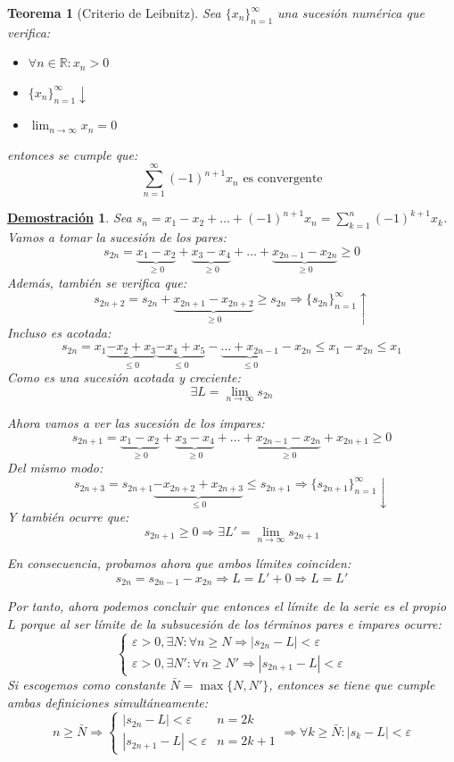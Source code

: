 \documentclass[10pt,a4paper,openright]{book}
\theoremstyle{break}
\newtheorem{theo}{Teorema}[chapter]
\newtheorem*{demo}{\underline{Demostración}}
\begin{document}
\begin{theo}[Criterio de Leibnitz]
Sea $\{x_n\}_{n=1}^\infty$ una sucesión numérica que verifica:
\begin{itemize}
\item $\forall n \in \mathbb{R}: x_n > 0$
\item $\{x_n\}_{n=1}^\infty \downarrow$
\item $\lim_{n \rightarrow \infty} x_n = 0$
\end{itemize}
entonces se cumple que:
$$\sum_{n=1}^{\infty} (-1)^{n+1}x_n\mbox{ es convergente}$$
\end{theo}
\begin{demo}
Sea $s_n = x_1 - x_2 + \ldots + (-1)^{n+1}x_n = \sum_{k=1}^{n} (-1)^{k+1} x_k$. Vamos a tomar la sucesión de los pares:
$$s_{2n} = \underbrace{x_1 - x_2}_{\geq 0} + \underbrace{x_3 - x_4}_{\geq 0} + \ldots + \underbrace{x_{2n-1} - x_{2n}}_{\geq 0} \geq 0$$
Además, también se verifica que:
$$s_{2n + 2} = s_{2n} + \underbrace{x_{2n + 1} - x_{2n + 2}}_{\geq 0} \geq s_{2n} \Rightarrow \{s_{2n}\}_{n=1}^\infty\uparrow$$
Incluso es acotada:
$$s_{2n} = x_1 \underbrace{-x_2 + x_3}_{\leq 0 } \underbrace{- x_4 + x_5 }_{\leq 0}- \underbrace{\ldots + x_{2n-1}}_{\leq 0} - x_{2n}\leq x_1 - x_{2n} \leq x_1 $$
Como es una sucesión acotada y creciente:
$$\exists L = \lim_{n \to \infty} s_{2n}$$

Ahora vamos a ver las sucesión de los impares:
$$s_{2n+1} =\underbrace{x_1 - x_2}_{\geq 0} + \underbrace{x_3 - x_4}_{\geq 0} + \ldots +\underbrace{x_{2n-1} - x_{2n}}_{\geq 0} + x_{2n+1} \geq 0$$
Del mismo modo:
$$s_{2n+3} = s_{2n+1} \underbrace{-x_{2n + 2} + x_{2n + 3}}_{\leq 0} \leq s_{2n+1} \Rightarrow  \{s_{2n+1}\}_{n=1}^\infty \downarrow$$
Y también ocurre que: 
$$s_{2n+1} \geq 0 \Rightarrow \exists L' = \lim_{n \to \infty} s_{2n+1}$$

En consecuencia, probamos ahora que ambos límites coinciden:
$$s_{2n} = s_{2n-1} - x_{2n} \Rightarrow L = L' + 0 \Rightarrow L = L'$$

Por tanto, ahora podemos concluir que entonces el límite de la serie es el propio $L$ porque al ser límite de la subsucesión de los términos pares e impares ocurre:
$$\begin{cases} \varepsilon > 0, \exists N : \forall n \geq N \Rightarrow |s_{2n} - L|<\varepsilon \\ \varepsilon > 0, \exists N' : \forall n \geq N' \Rightarrow |s_{2n+1} - L|<\varepsilon\end{cases} $$
Si escogemos como constante $\bar{N} = \max\{N, N'\}$, entonces se tiene que cumple ambas definiciones simultáneamente:
$$n \geq \bar{N} \Rightarrow \begin{cases} |s_{2n} - L|<\varepsilon & n = 2k \\ |s_{2n+1} - L|<\varepsilon & n = 2k+1\end{cases} \Rightarrow \forall k \geq \bar{N}: |s_k-L|<\varepsilon$$
\end{demo}
\end{document}
